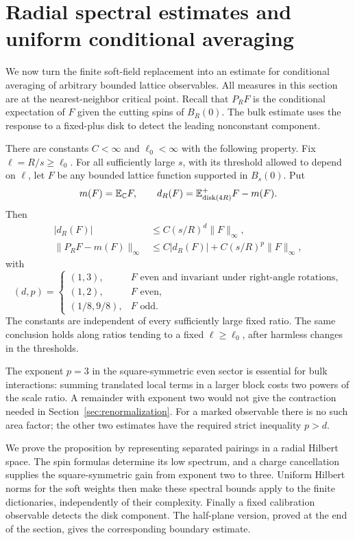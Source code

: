 \section{Radial spectral estimates and uniform conditional averaging}
\label{sec:radial}

We now turn the finite soft-field replacement into an estimate for
conditional averaging of arbitrary bounded lattice observables.  All
measures in this section are at the nearest-neighbor critical point.
Recall that $P_RF$ is the conditional expectation of $F$ given the
cutting spins of $B_R(0)$.  The bulk estimate uses the response to a
fixed-plus disk to detect the leading nonconstant component.

\begin{proposition}
\label{rad:operator}
There are constants $C<\infty$ and $\ell_0<\infty$ with the
following property.  Fix $\ell=R/s\geq\ell_0$.  For all sufficiently
large $s$, with its threshold allowed to depend on $\ell$, let $F$
be any bounded lattice function supported in $B_s(0)$.  Put
\[
  m(F)=\mathbb E_{\mathbb C}F,
  \qquad
  d_R(F)=\mathbb E^+_{\mathrm{disk}(4R)}F-m(F).
\]
Then
\begin{align}
 |d_R(F)|&\leq C(s/R)^d\|F\|_\infty,\label{eq:rad-response}\\
 \|P_RF-m(F)\|_\infty
   &\leq C|d_R(F)|+C(s/R)^p\|F\|_\infty,
 \label{eq:rad-operator}
\end{align}
with
\[
 (d,p)=
 \begin{cases}
 (1,3),&F\text{ even and invariant under right-angle rotations},\\
 (1,2),&F\text{ even},\\
 (1/8,9/8),&F\text{ odd}.
 \end{cases}
\]
The constants are independent of every sufficiently large fixed
ratio.  The same conclusion holds along ratios tending to a fixed
$\ell\geq\ell_0$, after harmless changes in the thresholds.
\end{proposition}

The exponent $p=3$ in the square-symmetric even sector is essential for
bulk interactions: summing translated local terms in a larger block
costs two powers of the scale ratio.  A remainder with exponent two
would not give the contraction needed in Section~\ref{sec:renormalization}.
For a marked observable there is no such area factor; the other two
estimates have the required strict inequality $p>d$.

We prove the proposition by representing separated pairings in a radial
Hilbert space.  The spin formulas determine its low spectrum, and a
charge cancellation supplies the square-symmetric gain from exponent
two to three.  Uniform Hilbert norms for the soft weights then make
these spectral bounds apply to the finite dictionaries, independently
of their complexity.  Finally a fixed calibration observable detects
the disk component.  The half-plane version, proved at the end of the
section, gives the corresponding boundary estimate.

